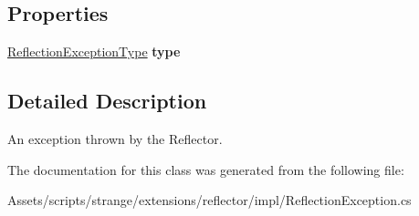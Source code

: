 \subsection*{Properties}
\begin{DoxyCompactItemize}
\item 
\hypertarget{classstrange_1_1extensions_1_1reflector_1_1impl_1_1_reflection_exception_a7d966c5d78022218025524fc16de5f6c}{\hyperlink{namespacestrange_1_1extensions_1_1reflector_1_1api_a4470d7d3edf61dfa229aec6e9a914159}{Reflection\-Exception\-Type} {\bfseries type}}\label{classstrange_1_1extensions_1_1reflector_1_1impl_1_1_reflection_exception_a7d966c5d78022218025524fc16de5f6c}

\end{DoxyCompactItemize}


\subsection{Detailed Description}
An exception thrown by the Reflector. 

The documentation for this class was generated from the following file\-:\begin{DoxyCompactItemize}
\item 
Assets/scripts/strange/extensions/reflector/impl/Reflection\-Exception.\-cs\end{DoxyCompactItemize}
